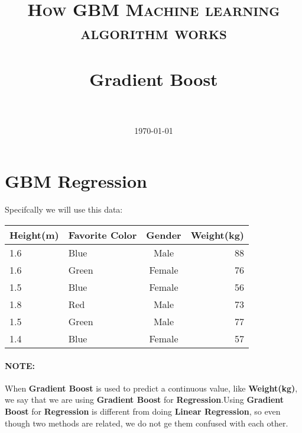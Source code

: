 \documentclass[12pt, a4paper]{article} %
\title{	
\normalfont \normalsize 
\textsc{How GBM Machine learning algorithm works} \\ [25pt] %
\horrule{0.5pt} \\[0.4cm] %
\huge Gradient Boost\\ %
\horrule{2pt} \\[0.5cm] %
}
\author{} %
\date{\today} %
\begin{document}
\maketitle %


\section{GBM Regression}
Specifcally we will use this data:

\begin{table}[h!]
\begin{center}
\begin{tabular}{m|l|c|r} %
    
    \hline
    \hline
    
         \textbf{Height(m)}
     
       & \textbf{Favorite Color}
      
       & \textbf{Gender}
       
       & \textbf{Weight(kg)}
       
      \\
      
      \hline
      \hline
      
      1.6 & Blue  & Male   & 88\\
      1.6 & Green & Female & 76\\
      1.5 & Blue  & Female & 56\\
      1.8 & Red   & Male   & 73\\
      1.5 & Green & Male   & 77\\
      1.4 & Blue  & Female & 57\\
      
      \hline
      \hline
      
\end{tabular}
\end{center}
\end{table}

\paragraph{NOTE:} When \textbf{Gradient Boost} is used to predict a continuous value, like \textbf{Weight(kg)}, we say that we are using \textbf{Gradient Boost} for \textbf{Regression}.Using \textbf{Gradient Boost} for \textbf{Regression} is different from doing \textbf{Linear Regression}, so even though two methods are related, we do not ge them confused with each other.
\end{document}
